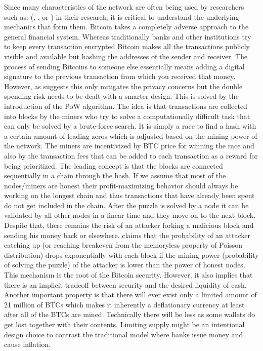 Since many characteristics of the network are often being used by researchers such as: 
(\cite{Kukacka2023}, \cite{Kristoufek2023}, \cite{Kubal2022} or \cite{Jay2020}) 
in their research, it is critical to understand the underlying mechanics that form them.
Bitcoin takes a completely adverse approach to the general financial system. Whereas traditionally
banks and other institutions try to keep every transaction encrypted Bitcoin makes all the 
transactions publicly visible and available but hashing the addresses of the sender and receiver.
The process of sending Bitcoins to someone else essentially means adding a digital signature to the
previous transaction from which you received that money. 
However, as \cite[see Chapter 2][pg.~2]{Nakamoto2008} suggests this only mitigates the privacy concerns
but the double spending risk needs to be dealt with a smarter design.
This is solved by the introduction of the \ac{PoW} algorithm. The idea is that
transactions are collected into blocks by the miners who try to solve a computationally difficult 
task that can only be solved by a brute-force search. It is simply a race to find a hash with a 
certain amount of leading zeros which is adjusted based on the mining power of the network.  
The miners are incentivized by \acs{BTC} price for winning the race and also by the transaction
fees that can be added to each transaction as a reward for being prioritized. 
The leading concept is that the blocks are connected sequentially in a chain through the hash.
If we assume that most of the nodes/miners are honest their profit-maximizing behavior should always be
working on the longest chain and thus transactions that have already been spent do not get included
in the chain. After the puzzle is solved by a node it can be validated by all other nodes
in a linear time and they move on to the next block. Despite that, there remains the risk of 
an attacker forking a malicious block and sending his money back or elsewhere. \cite{Nakamoto2008}
claims that the probability of an attacker catching up (or reaching breakeven from
the memoryless property of Poisson distribution) drops exponentially
with each block if the mining power (probability of solving the puzzle) of the
attacker is lower than the power of honest nodes. This mechanism is the root of the Bitcoin
security. However, it also implies that there is an implicit tradeoff between security and the
desired liquidity of cash. Another important property is that there will ever exist only a limited amount
of 21 million of \ac{BTC}s  which makes it inherently a deflationary currency at least
after all of the \ac{BTC}s are mined. Technically there will be less
as some wallets do get lost together with their contents. Limiting supply 
might be an intentional design choice
to contrast the traditional model where banks issue money and cause inflation.


